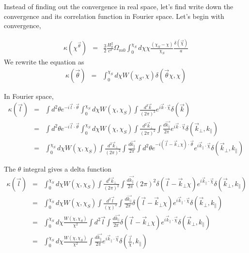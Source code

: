 \documentclass[12pt]{article}
\numberwithin{equation}{section}
\begin{document}
Instead of finding out the convergence in real space, let's find write down the convergence and its correlation function in Fourier space. Let's begin with convergence,

\begin{eqnarray}
\kappa (\chi^{\vec{\theta}}) 
&=& \frac{3}{2} \frac{H_0^2}{c^2} \Omega_{m0} \int_0^{\chi_S} d\chi \chi \frac{(\chi_S - \chi)}{\chi_S} \frac{\delta(\vec{\chi})}{a} 
\end{eqnarray}
We rewrite the equation as 
\begin{eqnarray}
\kappa (\vec{\theta})  &=&  \int_0^{\chi_S} d\chi W(\chi_S, \chi) \delta(\vec{\theta} \chi, \chi)
\end{eqnarray}

In Fourier space,
\begin{eqnarray}
\kappa(\vec{l}) 
&=& \int d^2\theta e^{-i\vec{l}\cdot\vec{\theta}}\int_0^{\chi_S}d\chi W(\chi, \chi_S) \int \frac{d^3 \vec{k}}{(2\pi)^3} e^{i\vec{k}\cdot\vec{\chi}} \delta(\vec{k})
\\
&=& \int d^2\theta e^{-i\vec{l}\cdot\vec{\theta}}\int_0^{\chi_S}d\chi W(\chi, \chi_S) \int \frac{d^2 \vec{k}_\perp}{(2\pi)^2}\int \frac{d\vec{k_\parallel}}{2\pi} e^{i\vec{k}\cdot\vec{\chi}} \delta(\vec{k}_\perp, k_\parallel)
\\
&=& \int_0^{\chi_S}d\chi W(\chi, \chi_S) \int \frac{d^2 \vec{k}_\perp}{(2\pi)^2}\int \frac{d\vec{k_\parallel}}{2\pi} \int d^2\theta e^{-i(\vec{l} - \vec{k}_\perp \chi )\cdot\vec{\theta}} e^{i\vec{k}_\parallel \cdot \vec{\chi}} \delta(\vec{k}_\perp, k_\parallel)
\end{eqnarray}

The $ \theta $ integral gives a delta function
\begin{eqnarray}
\kappa(\vec{l}) 
&=& \int_0^{\chi_S}d\chi W(\chi, \chi_S) \int \frac{d^2 \vec{k}_\perp}{(2\pi)^2}\int \frac{d\vec{k_\parallel}}{2\pi} (2\pi)^2 \delta(\vec{l} - \vec{k}_\perp \chi) e^{i\vec{k}_\parallel \cdot \vec{\chi}} \delta(\vec{k}_\perp, k_\parallel)
\\
&=& \int_0^{\chi_S}d\chi W(\chi, \chi_S) \int \frac{d^2 \vec{l}}{(\chi)^2}\int \frac{d\vec{k_\parallel}}{2\pi}  \delta(\vec{l} - \vec{k}_\perp \chi) e^{i\vec{k}_\parallel \cdot \vec{\chi}} \delta(\vec{k}_\perp, k_\parallel)
\\
&=& \int_0^{\chi_S}d\chi \frac{W(\chi, \chi_S)}{\chi^2} \int d^2 \vec{l}\int \frac{d\vec{k_\parallel}}{2\pi}  \delta(\vec{l} - \vec{k}_\perp \chi) e^{i\vec{k}_\parallel \cdot \vec{\chi}} \delta(\vec{k}_\perp, k_\parallel)
\\
&=& \int_0^{\chi_S}d\chi \frac{W(\chi, \chi_S)}{\chi^2} \int \frac{d\vec{k_\parallel}}{2\pi}   e^{i\vec{k}_\parallel \cdot \vec{\chi}} \delta(\frac{\vec{l}}{\chi}, k_\parallel)
\end{eqnarray}
\end{document}
